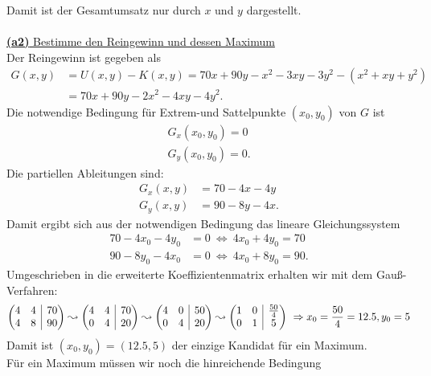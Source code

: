 Damit ist der Gesamtumsatz nur durch $ x $ und $ y $ dargestellt.\\
\\
\underline{\textbf{(a2)} Bestimme den Reingewinn und dessen Maximum}\\
Der Reingewinn ist gegeben als 
\begin{align*}
	G(x,y) &= U(x,y) - K(x,y) = 70x + 90 y- x^2 - 3 xy - 3 y^2 - (x^2 + xy + y^2 )\\
	&=
	70x + 90 y- 2x^2 -4 xy- 4 y^2.
\end{align*}
Die notwendige Bedingung für Extrem-und Sattelpunkte $ (x_0,y_0) $ von $ G $ ist
\begin{align*}
	G_x(x_0,y_0) =0 \\
	G_y(x_0,y_0) =0.
\end{align*}
Die partiellen Ableitungen sind:
\begin{align*}
	G_x(x,y) &= 70 - 4x - 4 y\\
	G_y(x,y) &= 90 -8y -4 x.
\end{align*}
Damit ergibt sich aus der notwendigen Bedingung das lineare Gleichungssystem
\begin{align*}
	70 - 4 x_0 - 4y_0 &= 0 \ \Leftrightarrow \ 4 x_0 + 4 y_0 = 70\\
	90 - 8 y_0 - 4 x_0 &= 0 \ \Leftrightarrow \ 4x_0 + 8y_0 = 90.
\end{align*}
Umgeschrieben in die erweiterte Koeffizientenmatrix erhalten wir mit dem Gauß-Verfahren:
\begin{align*}
	\begin{pmatrix}
		4 & 4 & \BAR &  70\\
		4 & 8 & \BAR & 90
	\end{pmatrix}
	\leadsto
	\begin{pmatrix}
		4 & 4 & \BAR &  70\\
		0 & 4 & \BAR & 20
	\end{pmatrix}
\leadsto
\begin{pmatrix}
	4 & 0 & \BAR &  50\\
	0 & 4 & \BAR & 20
\end{pmatrix}
\leadsto
\begin{pmatrix}
	1 & 0 & \BAR &  \frac{50}{4}\\
	0 & 1 & \BAR & 5
\end{pmatrix} \ \Rightarrow x_0 = \frac{50}{4}  =12.5, y_0 = 5
\end{align*}
Damit ist $ (x_0,y_0 ) = (12.5, 5) $ der einzige Kandidat für ein Maximum.\\
Für ein Maximum müssen wir noch die hinreichende Bedingung 
